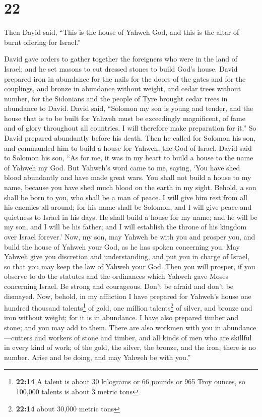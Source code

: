 \hypertarget{section-21}{%
\section{22}\label{section-21}}

 Then David said, ``This is the house of Yahweh God, and
this is the altar of burnt offering for Israel.''

 David gave orders to gather together the foreigners who
were in the land of Israel; and he set masons to cut dressed stones to
build God's house.  David prepared iron in abundance for
the nails for the doors of the gates and for the couplings, and bronze
in abundance without weight,  and cedar trees without
number, for the Sidonians and the people of Tyre brought cedar trees in
abundance to David.  David said, ``Solomon my son is young
and tender, and the house that is to be built for Yahweh must be
exceedingly magnificent, of fame and of glory throughout all countries.
I will therefore make preparation for it.'' So David prepared abundantly
before his death.  Then he called for Solomon his son, and
commanded him to build a house for Yahweh, the God of Israel.
 David said to Solomon his son, ``As for me, it was in my
heart to build a house to the name of Yahweh my God.  But
Yahweh's word came to me, saying, `You have shed blood abundantly and
have made great wars. You shall not build a house to my name, because
you have shed much blood on the earth in my sight. 
Behold, a son shall be born to you, who shall be a man of peace. I will
give him rest from all his enemies all around; for his name shall be
Solomon, and I will give peace and quietness to Israel in his days.
 He shall build a house for my name; and he will be my
son, and I will be his father; and I will establish the throne of his
kingdom over Israel forever.'  Now, my son, may Yahweh be
with you and prosper you, and build the house of Yahweh your God, as he
has spoken concerning you.  May Yahweh give you
discretion and understanding, and put you in charge of Israel, so that
you may keep the law of Yahweh your God.  Then you will
prosper, if you observe to do the statutes and the ordinances which
Yahweh gave Moses concerning Israel. Be strong and courageous. Don't be
afraid and don't be dismayed.  Now, behold, in my
affliction I have prepared for Yahweh's house one hundred thousand
talents\footnote{\textbf{22:14} A talent is about 30 kilograms or 66
  pounds or 965 Troy ounces, so 100,000 talents is about 3 metric tons}
of gold, one million talents\footnote{\textbf{22:14} about 30,000 metric
  tons} of silver, and bronze and iron without weight; for it is in
abundance. I have also prepared timber and stone; and you may add to
them.  There are also workmen with you in
abundance---cutters and workers of stone and timber, and all kinds of
men who are skillful in every kind of work;  of the gold,
the silver, the bronze, and the iron, there is no number. Arise and be
doing, and may Yahweh be with you.''


